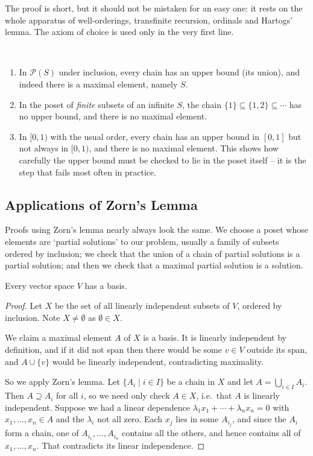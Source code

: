 The proof is short, but it should not be mistaken for an easy one: it rests on the whole apparatus of well-orderings, transfinite recursion, ordinals and Hartogs' lemma. The axiom of choice is used only in the very first line.

\begin{example}~
  \begin{enumerate}[label=(\roman*)]
    \item In $\mathcal{P}(S)$ under inclusion, every chain has an upper bound (its union), and indeed there is a maximal element, namely $S$.
    \item In the poset of \emph{finite} subsets of an infinite $S$, the chain $\{1\} \subseteq \{1,2\} \subseteq \cdots$ has no upper bound, and there is no maximal element.
    \item In $[0,1)$ with the usual order, every chain has an upper bound in $[0,1]$ but not always in $[0,1)$, and there is no maximal element. This shows how carefully the upper bound must be checked to lie in the poset itself -- it is the step that fails most often in practice.
  \end{enumerate}
\end{example}

\subsection{Applications of Zorn's Lemma}\label{sec:zornapps}

Proofs using Zorn's lemma nearly always look the same. We choose a poset whose elements are `partial solutions' to our problem, usually a family of subsets ordered by inclusion; we check that the union of a chain of partial solutions is a partial solution; and then we check that a maximal partial solution is a solution.

\begin{theorem}
  Every vector space $V$ has a basis.
\end{theorem}
\begin{proof}
  Let $X$ be the set of all linearly independent subsets of $V$, ordered by inclusion. Note $X \neq \emptyset$ as $\emptyset \in X$.

  We claim a maximal element $A$ of $X$ is a basis. It is linearly independent by definition, and if it did not span then there would be some $v \in V$ outside its span, and $A \cup \{v\}$ would be linearly independent, contradicting maximality.

  So we apply Zorn's lemma. Let $\{A_i \mid i \in I\}$ be a chain in $X$ and let $A = \bigcup_{i \in I} A_i$. Then $A \supseteq A_i$ for all $i$, so we need only check $A \in X$, i.e.\ that $A$ is linearly independent. Suppose we had a linear dependence $\lambda_1 x_1+\cdots+\lambda_n x_n=0$ with $x_1, \ldots, x_n \in A$ and the $\lambda_i$ not all zero. Each $x_j$ lies in some $A_{i_j}$, and since the $A_i$ form a chain, one of $A_{i_1}, \dots, A_{i_n}$ contains all the others, and hence contains all of $x_1, \dots, x_n$. That contradicts its linear independence.
\end{proof}

